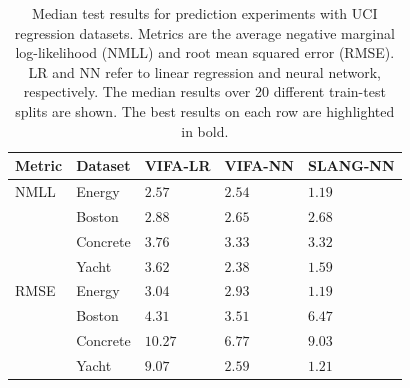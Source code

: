 \documentclass[10pt]{article} %
\begin{document}
\begin{table}[!h]
\caption{Median test results for prediction experiments with UCI regression datasets. Metrics are the average negative marginal log-likelihood (NMLL) and root mean squared error (RMSE). LR and NN refer to linear regression and neural network, respectively. The  median results over 20 different train-test splits are shown. The best results on each row are highlighted in bold.}
\label{table:neural_nets_uci_median}
\begin{center}
\begin{tabular}{l|llll}
\textbf{Metric} & \textbf{Dataset} & \textbf{VIFA-LR} & \textbf{VIFA-NN} & \textbf{SLANG-NN} \\ \hline
NMLL 	& Energy 		& $2.57$ 					& $2.54$ 					& $\mathbf{1.19}$ \\ 	
		& Boston   	& $2.88$	 				& $\mathbf{2.65}$ 			& $2.68$ \\ 			
		& Concrete	& $3.76$ 					& $3.33$ 					& $\mathbf{3.32}$ \\ 			
 	& Yacht    		& $3.62$ 					& $2.38$ 					& $\mathbf{1.59}$ \\ \hline
RMSE 	& Energy 	 	& $3.04$ 					& $2.93$ 					& $\mathbf{1.19}$ \\ 
		& Boston 	 	& $4.31$ 					& $\mathbf{3.51}$ 			& $6.47$ \\ 
		& Concrete  	& $10.27$ 				& $\mathbf{6.77}$ 			& $9.03$ \\ 
 	& Yacht 		& $9.07$ 					& $2.59$ 					& $\mathbf{1.21}$ \\ 
\end{tabular}
\end{center}
\end{table}
\end{document}
